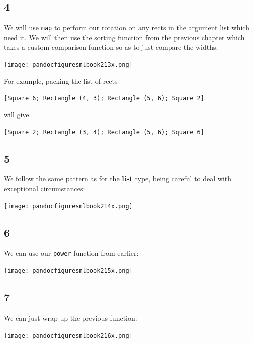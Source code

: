 \documentclass[]{book}
\newcommand{\smspace}{\vspace{4mm}}
\begin{document}
\subsection*{4}
We will use \texttt{map} to perform our rotation on any \textsf{rect}s in the argument list which need it. We will then use the sorting function from the previous chapter which takes a custom comparison function so as to just compare the widths.

\medskip
\begin{center}
\noindent\texttt{[image: pandocfiguresmlbook213x.png]}
\end{center}
\medskip

\noindent For example, packing the list of \textsf{rect}s

\smspace
\texttt{[Square 6; Rectangle (4, 3); Rectangle (5, 6); Square 2]}
\smspace

\noindent will give

\smspace
\texttt{[Square 2; Rectangle (3, 4); Rectangle (5, 6); Square 6]}

\subsection*{5}
We follow the same pattern as for the \textsf{\textbf{list}} type, being careful to deal with exceptional circumstances:

\medskip
\begin{center}
\noindent\texttt{[image: pandocfiguresmlbook214x.png]}
\end{center}
\medskip

\subsection*{6}
We can use our \texttt{power} function from earlier:

\medskip
\begin{center}
\noindent\texttt{[image: pandocfiguresmlbook215x.png]}
\end{center}
\medskip

\subsection*{7}
We can just wrap up the previous function:

\medskip
\begin{center}
\noindent\texttt{[image: pandocfiguresmlbook216x.png]}
\end{center}
\medskip
\end{document}
